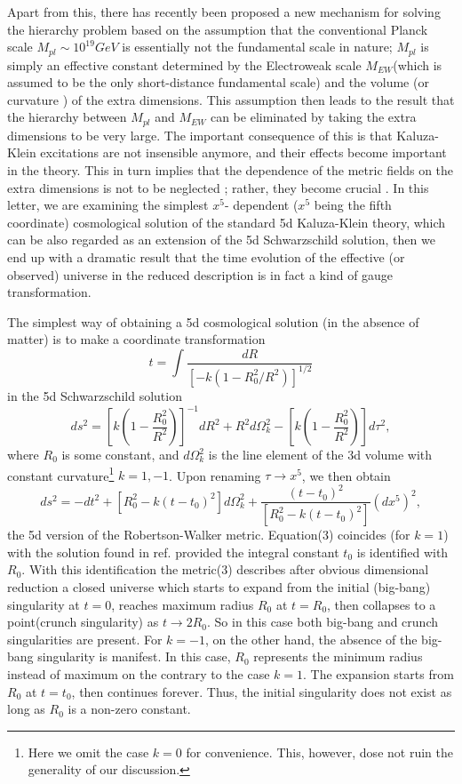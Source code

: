 \documentclass[a4paper,12pt]{article}
\begin{document}
Apart from this, there has recently been proposed a new mechanism
\cite{ark} for solving the hierarchy problem based on the
assumption that the conventional Planck scale $M_{pl} \sim 10^
{19}GeV$ is essentially not the fundamental scale in nature;
$M_{pl} $ is simply an effective constant determined by the
Electroweak scale $M_{EW}$(which is assumed to be the only
short-distance fundamental scale) and the volume (or curvature
\cite{ran}) of the extra dimensions. This assumption then leads to
the result that the hierarchy between $M_{pl}$ and $M_{EW}$ can be
eliminated by taking the extra dimensions to be very large. The
important consequence of this is that Kaluza-Klein excitations are
not insensible anymore, and their effects become important in the
theory. This in turn implies that the dependence of the metric
fields on the extra dimensions is not to be neglected ; rather,
they become crucial \cite{gid}. In this letter, we are examining
the simplest $x^5$- dependent ($x^5$ being the fifth coordinate)
cosmological solution of the standard 5d
 Kaluza-Klein theory, which can be also regarded as an extension
of the 5d Schwarzschild solution, then we end up with a dramatic
result that the time evolution of the effective (or observed)
universe in the reduced description is in fact a kind of gauge
transformation.

The simplest way of obtaining a 5d cosmological solution (in the
absence of matter) is to make a coordinate transformation
\begin{equation}
t= \int \frac{dR}{[-k(1-{R^2_0}/{R^2})]^{1/2}}
\end{equation}
in the 5d Schwarzschild solution
\begin{equation}
ds^2=[ k(1-\frac{R^2_0}{R^2}) ]^{-1}dR^2 + R^2d\Omega^2_k - [
k(1-\frac{R^2_0}{R^2} )] d\tau^2 ,
\end{equation}
where $R_0$ is some constant, and $d\Omega^2_k$ is the line
element of the 3d volume with constant curvature\footnote{Here we
omit the case $k=0$ for convenience. This, however, dose not ruin
the generality of our discussion.} $k=1,-1$. Upon renaming $\tau
\rightarrow x^5$, we then obtain
\begin{equation}
ds^2=-dt^2+[ R^2_0-k(t-t_0)^2]d\Omega^2_k +
\frac{(t-t_0)^2}{[R^2_0-k(t-t_0)^2]}(dx^5)^2 ,
\end{equation}
the 5d version of the Robertson-Walker metric. Equation(3)
coincides (for $k=1$) with the solution found in ref.\cite{mat}
provided the integral constant $t_0$ is identified with $R_0$.
With this identification the metric(3) describes after obvious
dimensional reduction a closed universe which starts
 to expand from the initial (big-bang) singularity at $t=0$,
reaches maximum radius $R_0$ at $t=R_0$, then collapses to a
point(crunch singularity) as $t\rightarrow 2R_0$. So in this case
both big-bang and crunch singularities are present. For $k=-1$, on
the other hand, the absence of the big-bang singularity is
manifest. In this case, $R_0$ represents the minimum radius
instead of maximum on the contrary to the case $k=1$. The
expansion starts from $R_0$ at $t=t_0$, then continues forever.
Thus, the initial singularity does not exist as long as $R_0$ is a
non-zero constant.
\end{document}
